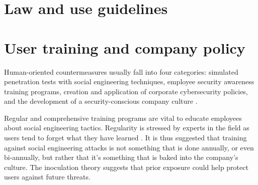 
\section{Law and use guidelines}
\begin{comment}
    
    - The best defense against SE attacks is an educated, conscious user
    - User education should be continuous and not a one-off event

\end{comment}








\section{User training and company policy}
\begin{comment}
    
    - The best defense against SE attacks is an educated, conscious user
    - User education should be continuous and not a one-off event

\end{comment}

Human-oriented countermeasures usually fall into four categories: simulated penetration tests with social engineering techniques, employee security awareness training programs, creation and application of corporate cybersecurity policies, and the development of a security-conscious company culture \citep{tsinganosTowardsAnAutomatedRecognitionSystem2018, mitnick_The_Art_of_Deception_2003}.

Regular and comprehensive training programs are vital to educate employees about social engineering tactics. Regularity is stressed by experts in the field as users tend to forget what they have learned \citep{hadnagySocialEngineering2018, mitnick_The_Art_of_Deception_2003}. It is thus suggested that training against social engineering attacks is not something that is done annually, or even bi-annually, but rather that it's something that is baked into the company's culture. The inoculation theory \citep{blauth_AI_Crime_Overview_Malicious_Use_Abuse_2022} suggests that prior exposure could help protect users against future threats.

